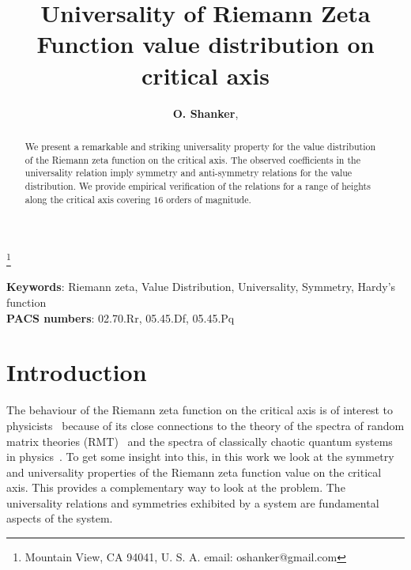 \documentclass[twoside]{article}
\begin{document}


\newtheorem{theorem}{Theorem}[section]
\newtheorem{lemma}[theorem]{Lemma}

\theoremstyle{definition}
\newtheorem{definition}[theorem]{Definition}
\newtheorem{example}[theorem]{Example}
\newtheorem{xca}[theorem]{Exercise}

\theoremstyle{remark}
\newtheorem{remark}[theorem]{Remark}



\date{}
\lhead[]{}
\rhead[]{}

\title{\bf{Universality of Riemann Zeta Function value distribution on critical axis}}

\maketitle


\author{{\textbf{O. Shanker}},}
\thanks{ Mountain View, CA 94041, U. S. A. email: oshanker@gmail.com}

\thispagestyle{fancy}

\begin{abstract}
We present a remarkable and striking universality property for the value distribution
of the Riemann zeta function on the critical axis. The observed coefficients 
in the universality relation imply
symmetry and anti-symmetry relations for the value distribution.
We provide empirical verification of the relations for a range of heights along the critical
axis covering $16$ orders of magnitude.

\end{abstract}
{\textbf {Keywords}:} Riemann zeta, Value Distribution, Universality, Symmetry, Hardy's function
\\
{\textbf {PACS numbers}:}  02.70.Rr, 05.45.Df, 05.45.Pq




\section{Introduction}
The behaviour of the Riemann zeta function on the critical axis is of interest to 
physicists~\cite{Shanker 2006} because of
its close connections  to the theory of the spectra of random matrix theories 
(RMT)~\cite{Wigner 1967, Gaudin 1960, Gaudin 1961, Dyson 1962, Bogomolny 1995, Bogomolny 1996, Katz 1999, Keating 2000a, Keating 2000b, Conrey 2000, 
Hughes 2000, Hughes 2001, Conrey 2002, Conrey 2003} 
and the spectra of classically chaotic quantum systems in 
physics~\cite{Berry 1985,Berry 1986,Berry 1987,Berry 1988}. 
To get some insight into this, 
in this work
we look at the symmetry and universality properties of the Riemann zeta function value 
on the critical axis. This provides a complementary way to look at the problem.
The universality relations and symmetries exhibited by a system are fundamental aspects of the system. 
\end{document}

